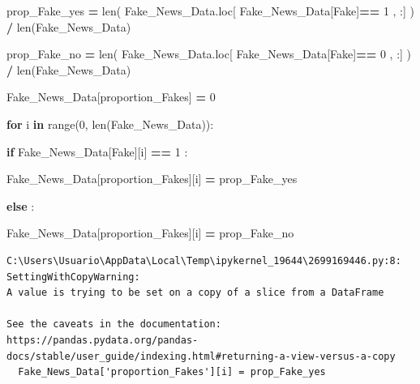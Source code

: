 \documentclass[
  11pt,
  a4paper,
]{article}
\newenvironment{Shaded}{\begin{snugshade}}{\end{snugshade}}
\newcommand{\BuiltInTok}[1]{#1}
\newcommand{\ControlFlowTok}[1]{\textcolor[rgb]{0.13,0.29,0.53}{\textbf{#1}}}
\newcommand{\DecValTok}[1]{\textcolor[rgb]{0.00,0.00,0.81}{#1}}
\newcommand{\KeywordTok}[1]{\textcolor[rgb]{0.13,0.29,0.53}{\textbf{#1}}}
\newcommand{\NormalTok}[1]{#1}
\newcommand{\OperatorTok}[1]{\textcolor[rgb]{0.81,0.36,0.00}{\textbf{#1}}}
\newcommand{\StringTok}[1]{\textcolor[rgb]{0.31,0.60,0.02}{#1}}
\begin{document}
\begin{Shaded}
\begin{Highlighting}[]
\NormalTok{prop\_Fake\_yes }\OperatorTok{=} \BuiltInTok{len}\NormalTok{( Fake\_News\_Data.loc[ Fake\_News\_Data[}\StringTok{\textquotesingle{}Fake\textquotesingle{}}\NormalTok{]}\OperatorTok{==} \DecValTok{1}\NormalTok{ , :] ) }\OperatorTok{/} \BuiltInTok{len}\NormalTok{(Fake\_News\_Data)}

\NormalTok{prop\_Fake\_no }\OperatorTok{=} \BuiltInTok{len}\NormalTok{( Fake\_News\_Data.loc[ Fake\_News\_Data[}\StringTok{\textquotesingle{}Fake\textquotesingle{}}\NormalTok{]}\OperatorTok{==} \DecValTok{0}\NormalTok{ , :] ) }\OperatorTok{/} \BuiltInTok{len}\NormalTok{(Fake\_News\_Data)}
\end{Highlighting}
\end{Shaded}

\begin{Shaded}
\begin{Highlighting}[]
\NormalTok{Fake\_News\_Data[}\StringTok{\textquotesingle{}proportion\_Fakes\textquotesingle{}}\NormalTok{] }\OperatorTok{=} \DecValTok{0}


\ControlFlowTok{for}\NormalTok{ i }\KeywordTok{in} \BuiltInTok{range}\NormalTok{(}\DecValTok{0}\NormalTok{, }\BuiltInTok{len}\NormalTok{(Fake\_News\_Data)):}

    \ControlFlowTok{if}\NormalTok{ Fake\_News\_Data[}\StringTok{\textquotesingle{}Fake\textquotesingle{}}\NormalTok{][i] }\OperatorTok{==} \DecValTok{1}\NormalTok{ :}

\NormalTok{        Fake\_News\_Data[}\StringTok{\textquotesingle{}proportion\_Fakes\textquotesingle{}}\NormalTok{][i] }\OperatorTok{=}\NormalTok{ prop\_Fake\_yes}

    \ControlFlowTok{else}\NormalTok{ :}

\NormalTok{        Fake\_News\_Data[}\StringTok{\textquotesingle{}proportion\_Fakes\textquotesingle{}}\NormalTok{][i] }\OperatorTok{=}\NormalTok{ prop\_Fake\_no}
\end{Highlighting}
\end{Shaded}

\begin{verbatim}
C:\Users\Usuario\AppData\Local\Temp\ipykernel_19644\2699169446.py:8: SettingWithCopyWarning: 
A value is trying to be set on a copy of a slice from a DataFrame

See the caveats in the documentation: https://pandas.pydata.org/pandas-docs/stable/user_guide/indexing.html#returning-a-view-versus-a-copy
  Fake_News_Data['proportion_Fakes'][i] = prop_Fake_yes
\end{verbatim}
\end{document}
